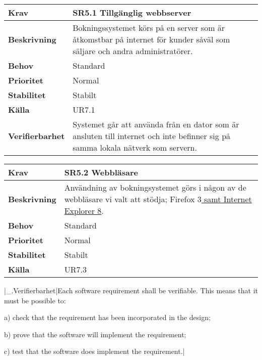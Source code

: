\documentclass[a4paper, twoside, 11pt, titlepage]{article}
\begin{document}
\begin{tabular} { p{2.6cm} p{12.5cm} }
	\hline
	\sffamily\textbf{Krav} & \sffamily\textbf{SR5.1 Tillgänglig webbserver } \\
	\hline
	\sffamily\textbf{Beskrivning} & Bokningssystemet körs på en server som är åtkomstbar på internet för kunder såväl som säljare och andra administratörer.  \\
	\hline
	\sffamily\textbf{Behov} & Standard  \\
	\hline
	\sffamily\textbf{Prioritet} & Normal  \\
	\hline
	\sffamily\textbf{Stabilitet} & Stabilt  \\
	\hline
	\sffamily\textbf{Källa} & UR7.1  \\
	\hline
	\sffamily\textbf{Verifierbarhet} & Systemet går att använda från en dator som är ansluten till internet och inte befinner sig på samma lokala nätverk som servern.  \\
	\hline
\end{tabular}
\vspace{6mm}

\begin{tabular} { p{2.6cm} p{12.5cm} }
	\hline
	\sffamily\textbf{Krav} & \sffamily\textbf{SR5.2 Webbläsare } \\
	\hline
	\sffamily\textbf{Beskrivning} & Användning av bokningsystemet görs i någon av de webbläsare vi valt att stödja; Firefox 3\underline{ samt Internet Explorer 8}.  \\
	\hline
	\sffamily\textbf{Behov} & Standard  \\
	\hline
	\sffamily\textbf{Prioritet} & Normal  \\
	\hline
	\sffamily\textbf{Stabilitet} & Stabilt  \\
	\hline
	\sffamily\textbf{Källa} & UR7.3  \\
	\hline
\end{tabular}
\vspace{6mm}

|\_.Verifierbarhet|Each software requirement shall be verifiable. This means that it must be possible to:

a) check that the requirement has been incorporated in the design;

b) prove that the software will implement the requirement;

c) test that the software does implement the requirement.|
\end{document}
